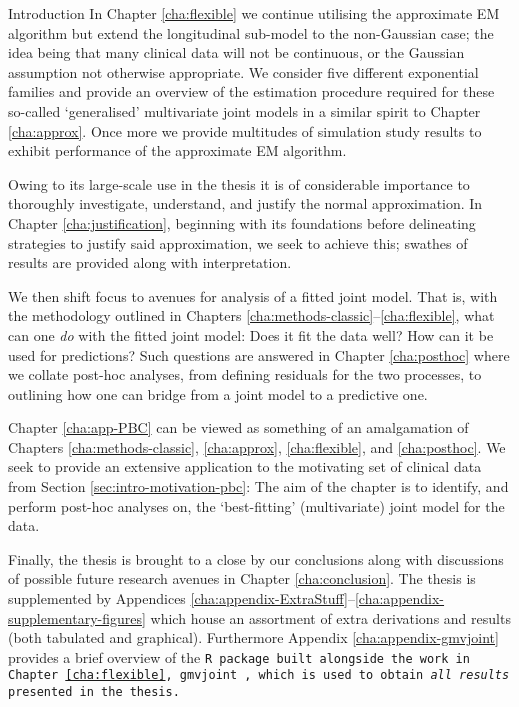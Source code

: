 \begin{chapter}{\label{cha:intro}Introduction}
  In Chapter \ref{cha:flexible} we continue utilising the approximate EM algorithm but extend the longitudinal sub-model to the non-Gaussian case; the idea being that many clinical data will not be continuous, or the Gaussian assumption not otherwise appropriate. We consider five different exponential families and provide an overview of the estimation procedure required for these so-called `generalised' multivariate joint models in a similar spirit to Chapter \ref{cha:approx}. Once more we provide multitudes of simulation study results to exhibit performance of the approximate EM algorithm.

  Owing to its large-scale use in the thesis it is of considerable importance to thoroughly investigate, understand, and justify the normal approximation. In Chapter \ref{cha:justification}, beginning with its foundations before delineating strategies to justify said approximation, we seek to achieve this; swathes of results are provided along with interpretation.

  We then shift focus to avenues for analysis of a fitted joint model. That is, with the methodology outlined in Chapters \ref{cha:methods-classic}--\ref{cha:flexible}, what can one \textit{do} with the fitted joint model: Does it fit the data well? How can it be used for predictions? Such questions are answered in Chapter \ref{cha:posthoc} where we collate post-hoc analyses, from defining residuals for the two processes, to outlining how one can bridge from a joint model to a predictive one.

  Chapter \ref{cha:app-PBC} can be viewed as something of an amalgamation of Chapters \ref{cha:methods-classic}, \ref{cha:approx}, \ref{cha:flexible}, and \ref{cha:posthoc}. We seek to provide an extensive application to the motivating set of clinical data from Section \ref{sec:intro-motivation-pbc}: The aim of the chapter is to identify, and perform post-hoc analyses on, the `best-fitting' (multivariate) joint model for the data.  

  Finally, the thesis is brought to a close by our conclusions along with discussions of possible future research avenues in Chapter \ref{cha:conclusion}. The thesis is supplemented by Appendices \ref{cha:appendix-ExtraStuff}--\ref{cha:appendix-supplementary-figures} which house an assortment of extra derivations and results (both tabulated and graphical). Furthermore Appendix \ref{cha:appendix-gmvjoint} provides a brief overview of the \tt{R} package built alongside the work in Chapter \ref{cha:flexible}, \tt{gmvjoint} \citep{Murray2023}, which is used to obtain \textit{all results} presented in the thesis.
\end{chapter}